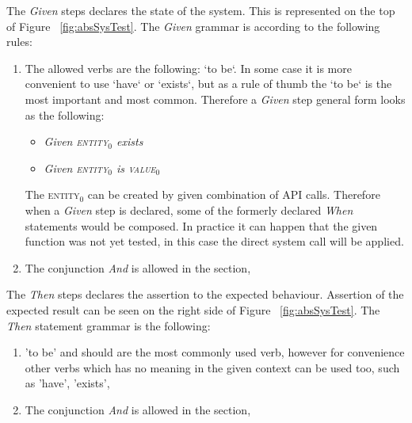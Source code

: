 \documentclass[conference]{IEEEtran}
\begin{document}
The \textit{Given} steps declares the state of the system. This is represented on the top of Figure ~\ref{fig:absSysTest}. The \textit{Given} grammar is according to the following rules:
\begin{enumerate}[label=g.\arabic*]
    \item The allowed verbs are the following: `to be`. In some case it is more convenient to use `have` or `exists`, but as a rule of thumb the `to be` is the most important and most common. Therefore a \textit{Given} step general form looks as the following:
    \begin{itemize}
        \item \textit{Given \textsc{entity\(_{0} \)} exists}
        \item \textit{Given \textsc{entity\(_{0} \)} is \textsc{value\(_{0} \)}}
    \end{itemize}
    The \textsc{entity\(_{0} \)} can be created by given combination of API calls. Therefore when a \textit{Given} step is declared, some of the formerly declared \textit{When} statements would be composed. In practice it can happen that the given function was not yet tested, in this case the direct system call will be applied.
    \item The conjunction \textit{And} is allowed in the  section,
\end{enumerate}

The \textit{Then} steps declares the assertion to the expected behaviour. Assertion of the expected result can be seen on the right side of Figure ~\ref{fig:absSysTest}. The \textit{Then} statement grammar is the following:
\begin{enumerate}[label=t.\arabic*]
    \item 'to be' and should are the most commonly used verb, however for convenience other verbs which has no meaning in the given context can be used too, such as 'have', 'exists',
    \item The conjunction \textit{And} is allowed in the  section,
\end{enumerate}
\end{document}
